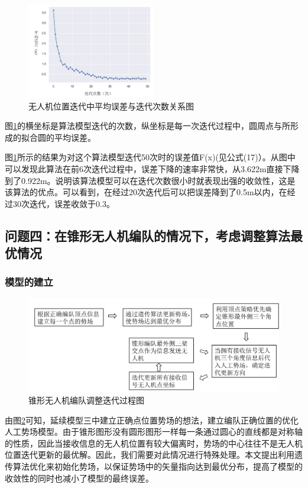 \documentclass{my_paper}
\begin{document}
\begin{figure}[h]
    \centering
    \includegraphics[width=0.5\textwidth]{wucha.jpg}
    \caption{无人机位置迭代中平均误差与迭代次数关系图}
    \label{wucha}
\end{figure}
图\ref{wucha}的横坐标是算法模型迭代的次数，纵坐标是每一次迭代过程中，圆周点与所形成的拟合圆的平均误差。


图\ref{wucha}所示的结果为对这个算法模型迭代50次时的误差值F(x)(见公式(17)）。从图中可以发现此算法在前6次迭代过程中，误差下降的速率非常快，从3.622m直接下降到了0.922m。说明该算法模型可以在迭代次数很小时就表现出强的收敛性，这是该算法的优点。可以看到，在经过20次迭代后可以把误差降到了0.5m以内，在经过30次迭代，误差收敛于0.3。


\subsection{问题四：在锥形无人机编队的情况下，考虑调整算法最优情况}

\subsubsection{模型的建立}

\begin{figure}[h]
    \centering
    \includegraphics[width=1\textwidth]{wentisi.jpg}
    \caption{锥形无人机编队调整迭代过程图}
    \label{wentisi}
\end{figure}

由图\ref{wentisi}可知，延续模型三中建立正确点位置势场的想法，建立编队正确位置的优化人工势场模型。由于锥形图形没有圆形图形一样每一条通过圆心的直线都是对称轴的性质，因此当接收信息的无人机位置有较大偏离时，势场的中心往往不是无人机位置迭代更新的最优解。因此，我们需要对此情况进行特殊处理。本文提出利用遗传算法优化来初始化势场，以保证势场中的矢量指向达到最优分布，提高了模型的收敛性的同时也减小了模型的最终误差。
\end{document}
